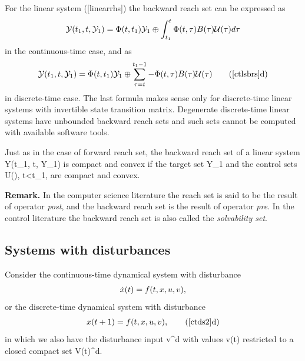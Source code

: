 \documentclass[letterpaper,10pt,english]{sphinxmanual}
\begin{document}
For the linear system ({[}linearrhs{]}) the backward reach set can be
expressed as
\begin{gather}
\begin{split}{\mathcal Y}(t_1, t, {\mathcal Y}_1) =
\Phi(t, t_1){\mathcal Y}_1 \oplus \int_{t_1}^t\Phi(t, \tau)B(\tau){\mathcal U}(\tau)d\tau
\label{ctlsbrs}\end{split}\notag
\end{gather}
in the continuous-time case, and as
\begin{gather}
\begin{split}{\mathcal Y}(t_1, t, {\mathcal Y}_1) =
\Phi(t, t_1){\mathcal Y}_1 \oplus \sum_{\tau =t}^{t_1-1}-\Phi(t, \tau)B(\tau){\mathcal U}(\tau)
\tag*{(\ref{ctlsbrs}d)}
\label{dtlsbrs}\end{split}\notag
\end{gather}
in discrete-time case. The last formula makes sense only for
discrete-time linear systems with invertible state transition matrix.
Degenerate discrete-time linear systems have unbounded backward reach
sets and such sets cannot be computed with available software tools.

Just as in the case of forward reach set, the backward reach set of a
linear system {\mathcal Y}(t_1, t, {\mathcal Y}_1) is compact
and convex if the target set {\mathcal Y}_1 and the control sets
{\mathcal U}(\tau), t\leqslant\tau<t_1, are compact and
convex.

\textbf{Remark.} In the computer science literature the reach set is said to
be the result of operator \emph{post}, and the backward reach set is the
result of operator \emph{pre}. In the control literature the backward reach
set is also called the \emph{solvability set}.


\subsection{Systems with disturbances}
\label{chap_reach:systems-with-disturbances}
Consider the continuous-time dynamical system with disturbance
\begin{gather}
\begin{split}\dot{x}(t) = f(t, x, u, v),
\label{ctds2}\end{split}\notag
\end{gather}
or the discrete-time dynamical system with disturbance
\begin{gather}
\begin{split}x(t+1) = f(t, x, u, v),
\tag*{(\ref{ctds2}d)}
\label{dtds2}\end{split}\notag
\end{gather}
in which we also have the disturbance input v^d with
values v(t) restricted to a closed compact set
{\mathcal V}(t)^d.
\end{document}
